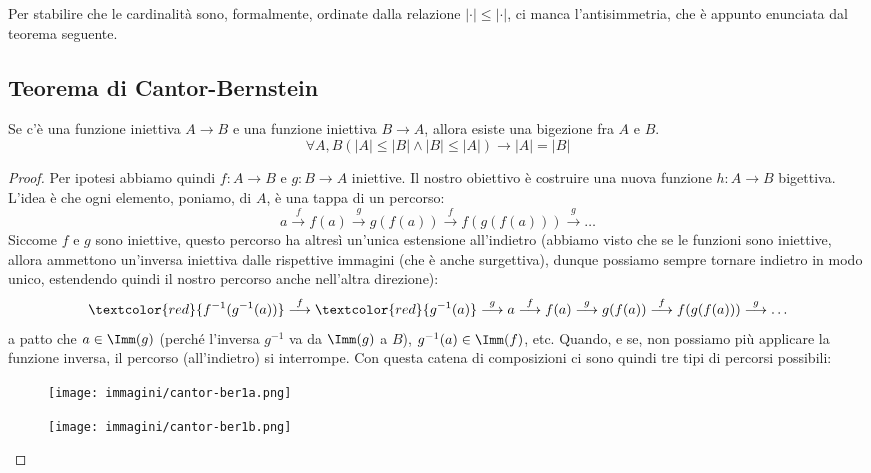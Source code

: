 \documentclass[11pt]{scrartcl}
\begin{document}
Per stabilire che le cardinalità sono, formalmente, ordinate dalla relazione $|\cdot| \leq |\cdot|$, ci manca l'antisimmetria, che è appunto enunciata dal teorema seguente.

\subsection{Teorema di Cantor-Bernstein}

\begin{theorem}
	\label{CB}
	Se c'è una funzione iniettiva $A \rightarrow B$ e una funzione iniettiva $B \rightarrow A$, allora esiste una bigezione fra $A$ e $B$.
	\[ \forall A,B (|A| \leq |B| \land |B| \leq |A|) \rightarrow |A| = |B|
		\]
\end{theorem}

\begin{proof}
	Per ipotesi abbiamo quindi $f: A \rightarrow B$ e $g: B \rightarrow A$ iniettive. Il nostro obiettivo è costruire una nuova funzione $h : A \rightarrow B$ bigettiva.\\
	L'idea è che ogni elemento, poniamo, di $A$, è una tappa di un percorso:
	\[ a \overset{f}{\longrightarrow} f(a) \overset{g}{\longrightarrow} g(f(a)) \overset{f}{\longrightarrow} f(g(f(a))) \overset{g}{\longrightarrow} \dots
		\]
	Siccome $f$ e $g$ sono iniettive, questo percorso ha altresì un'unica estensione all'indietro (abbiamo visto che se le funzioni sono iniettive, allora ammettono un'inversa iniettiva dalle rispettive immagini (che è anche surgettiva), dunque possiamo sempre tornare indietro in modo unico, estendendo quindi 
	il nostro percorso anche nell'altra direzione):
	\[ \textcolor{red}{f^{-1}(g^{-1}(a))} \overset{f}{\longrightarrow} \textcolor{red}{g^{-1}(a)} \overset{g}{\longrightarrow} a \overset{f}{\longrightarrow} f(a) \overset{g}{\longrightarrow} g(f(a)) \overset{f}{\longrightarrow} f(g(f(a))) \overset{g}{\longrightarrow} \ldots
		\]
	a patto che $a \in \Imm(g)$ (perché l'inversa $g^{-1}$ va da $\Imm(g)$ a $B$), $g^{-1}(a) \in \Imm(f)$, etc. Quando, e se, non possiamo più applicare la funzione inversa, il percorso (all'indietro) si interrompe. Con questa catena di composizioni ci sono quindi tre tipi di percorsi possibili:
 	\begin{center}
		\begin{figure}[H]
			\centering
			\texttt{[image: immagini/cantor-ber1a.png]}
		\end{figure}
	\end{center}
	\begin{center}
		\begin{figure}[H]
			\centering
			\texttt{[image: immagini/cantor-ber1b.png]}
		\end{figure}
	\end{center}
	

\end{proof}
\end{document}
